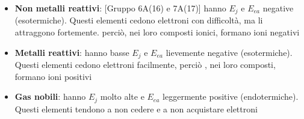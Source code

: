 \documentclass[a4paper,11pt]{report}
\begin{document}
\begin{itemize}
	\item \textbf{Non metalli reattivi}: [Gruppo 6A(16) e 7A(17)] hanno $E_j$ e $E_{ea}$ negative (esotermiche). Questi elementi cedono elettroni con difficoltà, ma li attraggono fortemente. perciò, nei loro composti ionici, formano ioni negativi
	\item \textbf{Metalli reattivi}: hanno basse $E_j$ e $E_{ea}$ lievemente negative (esotermiche). Questi elementi cedono elettroni facilmente, perciò , nei loro composti, formano ioni positivi
	\item \textbf{Gas nobili}: hanno $E_j$ molto alte e $E_{ea}$ leggermente positive (endotermiche). Questi elementi tendono a non cedere e a non acquistare elettroni
\end{itemize}
\end{document}
